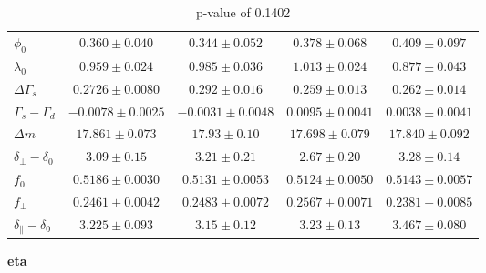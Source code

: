 \documentclass[aspectratio=43]{beamer}
\begin{document}
\begin{frame}
\begin{table}[H]
{\begin{tabular}{l|cccc}
\hline
$                        \phi_0$ & $     0.360 \pm 0.040$ & $     0.344 \pm 0.052$ & $     0.378 \pm 0.068$ & $     0.409 \pm 0.097$ \\
$                     \lambda_0$ & $     0.959 \pm 0.024$ & $     0.985 \pm 0.036$ & $     1.013 \pm 0.024$ & $     0.877 \pm 0.043$ \\
$                \Delta\Gamma_s$ & $   0.2726 \pm 0.0080$ & $     0.292 \pm 0.016$ & $     0.259 \pm 0.013$ & $     0.262 \pm 0.014$ \\
$           \Gamma_s - \Gamma_d$ & $  -0.0078 \pm 0.0025$ & $  -0.0031 \pm 0.0048$ & $   0.0095 \pm 0.0041$ & $   0.0038 \pm 0.0041$ \\
$                      \Delta m$ & $    17.861 \pm 0.073$ & $      17.93 \pm 0.10$ & $    17.698 \pm 0.079$ & $    17.840 \pm 0.092$ \\
$     \delta_{\perp} - \delta_0$ & $       3.09 \pm 0.15$ & $       3.21 \pm 0.21$ & $       2.67 \pm 0.20$ & $       3.28 \pm 0.14$ \\
$                           f_0$ & $   0.5186 \pm 0.0030$ & $   0.5131 \pm 0.0053$ & $   0.5124 \pm 0.0050$ & $   0.5143 \pm 0.0057$ \\
$                     f_{\perp}$ & $   0.2461 \pm 0.0042$ & $   0.2483 \pm 0.0072$ & $   0.2567 \pm 0.0071$ & $   0.2381 \pm 0.0085$ \\
$ \delta_{\parallel} - \delta_0$ & $     3.225 \pm 0.093$ & $       3.15 \pm 0.12$ & $       3.23 \pm 0.13$ & $     3.467 \pm 0.080$ \\
\end{tabular}}
\caption{
p-value of 0.1402
}\end{table}
\newpage \textbf{ eta }
\begin{table}[H]
\end{table}
\end{frame}
\end{document}
